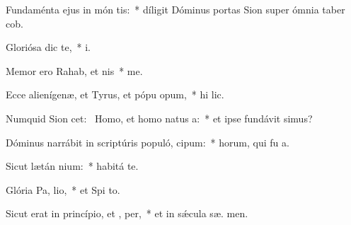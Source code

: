 \item Fundaménta ejus in món tis:~* díligit Dóminus portas Sion super ómnia taber cob.
\item Gloriósa dic   te,~*  i.
\item Memor ero Rahab, et nis~*  me.
\item Ecce alienígenæ, et Tyrus, et pópu opum,~* hi  lic.
\item Numquid Sion cet:~\pscross{} Homo, et homo natus   a:~* et ipse fundávit  simus?
\item Dóminus narrábit in scriptúris populó,  cipum:~* horum, qui fu  a.
\item Sicut lætán nium:~* habitá   te.
\item Glória Pa,  lio,~* et Spi to.
\item Sicut erat in princípio, et ,  per,~* et in sǽcula sæ. men.
